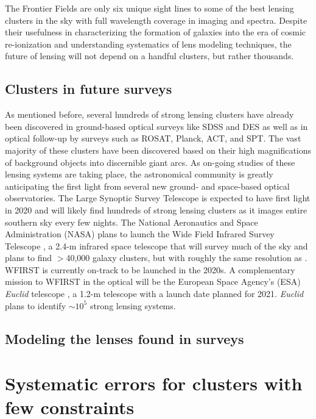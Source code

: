 The Frontier Fields are only six unique sight lines to some of the best lensing clusters in the sky with full wavelength coverage in imaging and spectra. Despite their usefulness in characterizing the formation of galaxies into the era of cosmic re-ionization and understanding systematics of lens modeling techniques, the future of lensing will not depend on a handful clusters, but rather thousands.

\subsection{Clusters in future surveys}

As mentioned before, several hundreds of strong lensing clusters have already been discovered in ground-based optical surveys like SDSS and DES as well as in optical follow-up by surveys such as ROSAT, Planck, ACT, and SPT. The vast majority of these clusters have been discovered based on their high magnifications of background objects into discernible giant arcs. As on-going studies of these lensing systems are taking place, the astronomical community is greatly anticipating the first light from several new ground- and space-based optical observatories. The Large Synoptic Survey Telescope \citep[LSST; ][]{IVezic:2008tv} is expected to have first light in 2020 and will likely find hundreds of strong lensing clusters as it images entire southern sky every few nights. The National Aeronautics and Space Administration (NASA) plans to launch the Wide Field Infrared Survey Telescope \citep[WFIRST; ][]{Spergel:2013zk}, a 2.4-m infrared space telescope that will survey much of the sky and plans to find $>$40,000 galaxy clusters, but with roughly the same resolution as \hst. WFIRST is currently on-track to be launched in the 2020s. A complementary mission to WFIRST in the optical will be the European Space Agency's (ESA) {\it Euclid} telescope \citep{Laureijs:2011qt}, a 1.2-m telescope with a launch date planned for 2021. {\it Euclid} plans to identify $\sim10^5$ strong lensing systems.

\subsection{Modeling the lenses found in surveys}

\section{Systematic errors for clusters with few constraints}


